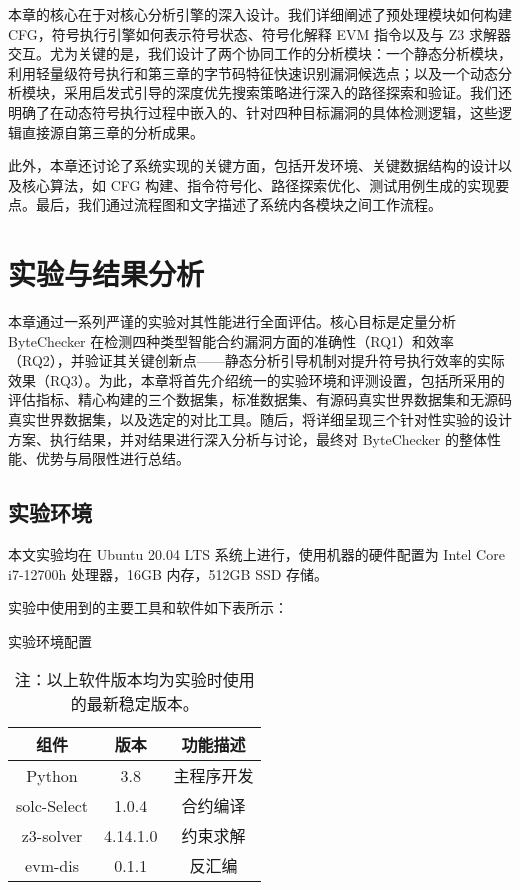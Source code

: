\documentclass[print, master, vlined, timesmath]{DissertUESTC}
\begin{document}
本章的核心在于对核心分析引擎的深入设计。我们详细阐述了预处理模块如何构建 CFG，符号执行引擎如何表示符号状态、符号化解释 EVM 指令以及与 Z3 求解器交互。尤为关键的是，我们设计了两个协同工作的分析模块：一个静态分析模块，利用轻量级符号执行和第三章的字节码特征快速识别漏洞候选点；以及一个动态分析模块，采用启发式引导的深度优先搜索策略进行深入的路径探索和验证。我们还明确了在动态符号执行过程中嵌入的、针对四种目标漏洞的具体检测逻辑，这些逻辑直接源自第三章的分析成果。

此外，本章还讨论了系统实现的关键方面，包括开发环境、关键数据结构的设计以及核心算法，如 CFG 构建、指令符号化、路径探索优化、测试用例生成的实现要点。最后，我们通过流程图和文字描述了系统内各模块之间工作流程。

\chapter{实验与结果分析}


本章通过一系列严谨的实验对其性能进行全面评估。核心目标是定量分析 ByteChecker 在检测四种类型智能合约漏洞方面的准确性（RQ1）和效率（RQ2），并验证其关键创新点——静态分析引导机制对提升符号执行效率的实际效果（RQ3）。为此，本章将首先介绍统一的实验环境和评测设置，包括所采用的评估指标、精心构建的三个数据集，标准数据集、有源码真实世界数据集和无源码真实世界数据集，以及选定的对比工具。随后，将详细呈现三个针对性实验的设计方案、执行结果，并对结果进行深入分析与讨论，最终对 ByteChecker 的整体性能、优势与局限性进行总结。

\section{实验环境}

本文实验均在 Ubuntu 20.04 LTS 系统上进行，使用机器的硬件配置为 Intel Core i7-12700h 处理器，16GB 内存，512GB SSD 存储。

实验中使用到的主要工具和软件如下表所示：

\begin{table}[H]
    \centering
    \caption{实验环境配置}
    \label{tab:env_config}
    \begin{tabular}{|c|c|c|}
        \hline
        \textbf{组件} & \textbf{版本} & \textbf{功能描述}\\ \hline
        Python & 3.8 & 主程序开发\\ \hline
        solc-Select & 1.0.4 & 合约编译\\ \hline
        z3-solver & 4.14.1.0 & 约束求解\\ \hline
        evm-dis & 0.1.1 & 反汇编\\ \hline
    \end{tabular}
    \caption*{注：以上软件版本均为实验时使用的最新稳定版本。}
\end{table}
\end{document}
